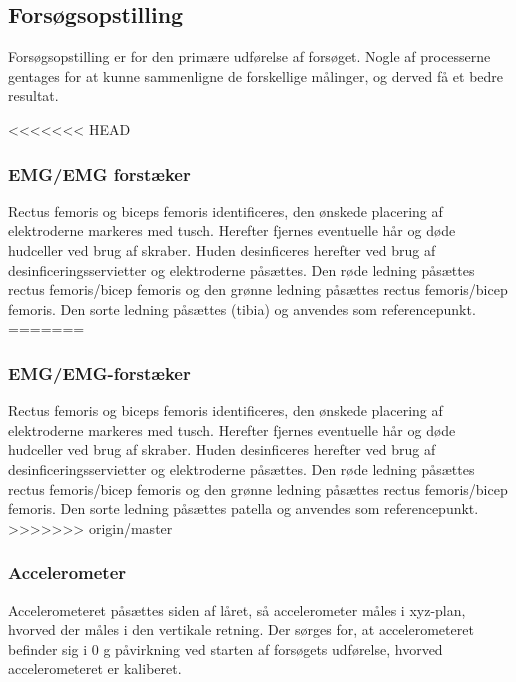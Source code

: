 \subsection{Forsøgsopstilling}
Forsøgsopstilling er for den primære udførelse af forsøget. Nogle af processerne gentages for at kunne sammenligne de forskellige målinger, og derved få et bedre resultat.

<<<<<<< HEAD
\subsubsection{EMG/EMG forstæker}
Rectus femoris og biceps femoris identificeres, den ønskede placering af elektroderne markeres med tusch. Herefter fjernes eventuelle hår og døde hudceller ved brug af skraber. Huden desinficeres herefter ved brug af desinficeringsservietter og elektroderne påsættes. Den røde ledning påsættes rectus femoris/bicep femoris og den grønne ledning påsættes rectus femoris/bicep femoris. Den sorte ledning påsættes (tibia) og anvendes som referencepunkt.
=======
\subsubsection{EMG/EMG-forstæker}
Rectus femoris og biceps femoris identificeres, den ønskede placering af elektroderne markeres med tusch. Herefter fjernes eventuelle hår og døde hudceller ved brug af skraber. Huden desinficeres herefter ved brug af desinficeringsservietter og elektroderne påsættes. Den røde ledning påsættes rectus femoris/bicep femoris og den grønne ledning påsættes rectus femoris/bicep femoris. Den sorte ledning påsættes patella og anvendes som referencepunkt.
>>>>>>> origin/master

\subsubsection{Accelerometer}
Accelerometeret påsættes siden af låret, så accelerometer måles i xyz-plan, hvorved der måles i den vertikale retning. Der sørges for,  at accelerometeret befinder sig i 0 g påvirkning ved starten af forsøgets udførelse, hvorved accelerometeret er kaliberet. 

